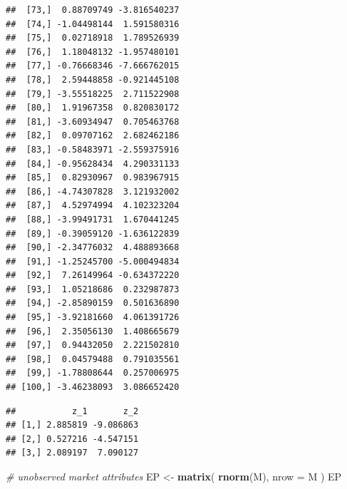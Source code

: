 \documentclass[]{book}
\newenvironment{Shaded}{\begin{snugshade}}{\end{snugshade}}
\newcommand{\KeywordTok}[1]{\textcolor[rgb]{0.13,0.29,0.53}{\textbf{#1}}}
\newcommand{\DataTypeTok}[1]{\textcolor[rgb]{0.13,0.29,0.53}{#1}}
\newcommand{\DecValTok}[1]{\textcolor[rgb]{0.00,0.00,0.81}{#1}}
\newcommand{\StringTok}[1]{\textcolor[rgb]{0.31,0.60,0.02}{#1}}
\newcommand{\CommentTok}[1]{\textcolor[rgb]{0.56,0.35,0.01}{\textit{#1}}}
\newcommand{\OperatorTok}[1]{\textcolor[rgb]{0.81,0.36,0.00}{\textbf{#1}}}
\newcommand{\NormalTok}[1]{#1}
\begin{document}
\begin{verbatim}
##  [73,]  0.88709749 -3.816540237
##  [74,] -1.04498144  1.591580316
##  [75,]  0.02718918  1.789526939
##  [76,]  1.18048132 -1.957480101
##  [77,] -0.76668346 -7.666762015
##  [78,]  2.59448858 -0.921445108
##  [79,] -3.55518225  2.711522908
##  [80,]  1.91967358  0.820830172
##  [81,] -3.60934947  0.705463768
##  [82,]  0.09707162  2.682462186
##  [83,] -0.58483971 -2.559375916
##  [84,] -0.95628434  4.290331133
##  [85,]  0.82930967  0.983967915
##  [86,] -4.74307828  3.121932002
##  [87,]  4.52974994  4.102323204
##  [88,] -3.99491731  1.670441245
##  [89,] -0.39059120 -1.636122839
##  [90,] -2.34776032  4.488893668
##  [91,] -1.25245700 -5.000494834
##  [92,]  7.26149964 -0.634372220
##  [93,]  1.05218686  0.232987873
##  [94,] -2.85890159  0.501636890
##  [95,] -3.92181660  4.061391726
##  [96,]  2.35056130  1.408665679
##  [97,]  0.94432050  2.221502810
##  [98,]  0.04579488  0.791035561
##  [99,] -1.78808644  0.257006975
## [100,] -3.46238093  3.086652420
\end{verbatim}

\begin{Shaded}
\end{Shaded}

\begin{verbatim}
##           z_1       z_2
## [1,] 2.885819 -9.086863
## [2,] 0.527216 -4.547151
## [3,] 2.089197  7.090127
\end{verbatim}

\begin{Shaded}
\begin{Highlighting}[]
\CommentTok{# unobserved market attributes}
\NormalTok{EP <-}\StringTok{ }\KeywordTok{matrix}\NormalTok{(}
  \KeywordTok{rnorm}\NormalTok{(M),}
  \DataTypeTok{nrow =}\NormalTok{ M}
\NormalTok{)}
\NormalTok{EP}
\end{Highlighting}
\end{Shaded}
\end{document}
